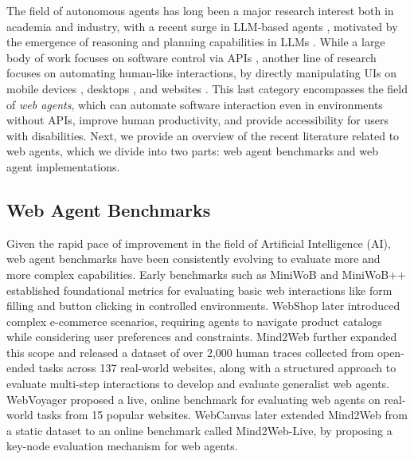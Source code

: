 \documentclass[10pt]{article} %
\begin{document}
The field of autonomous agents has long been a major research interest both in academia and industry, with a recent surge in LLM-based agents \citep{wang2024survey}, motivated by the emergence of reasoning and planning capabilities in LLMs
\citep{Huang2024UnderstandingTP,Wang2024ExploringTR}.
While a large body of work focuses on software control via APIs \citep{autogpt,hao2024toolkengpt,du2024anytool}, another line of research focuses on automating human-like interactions, by directly manipulating UIs on mobile devices \citep{seq2act,aitw23,androidworld}, desktops \citep{osworld,windows-agent-arena}, and websites \citep{furuta2023multimodal,gur2023webagent,rci-agent,workarena,weblinx}. This last category encompasses the field of \emph{web agents}, which can automate software interaction even in environments without APIs, improve human productivity, and provide accessibility for users with disabilities. Next, we provide an overview of the recent literature related to web agents, which we divide into two parts: web agent benchmarks and web agent implementations.

\subsection{Web Agent Benchmarks}

Given the rapid pace of improvement in the field of Artificial Intelligence (AI), web agent benchmarks have been consistently evolving to evaluate more and more complex capabilities.
Early benchmarks such as MiniWoB and MiniWoB++ \citep{world-of-bits,Miniwob_plusplus} established foundational metrics for evaluating basic web interactions like form filling and button clicking in controlled environments.
WebShop \citep{webshop} later introduced complex e-commerce scenarios, requiring agents to navigate product catalogs while considering user preferences and constraints. Mind2Web \citep{mind2web} further expanded this scope and released a dataset of over 2,000 human traces collected from open-ended tasks across 137 real-world websites, along with a structured approach to evaluate multi-step interactions to develop and evaluate generalist web agents. WebVoyager \citep{web-voyager} proposed a live, online benchmark for evaluating web agents on real-world tasks from 15 popular websites. WebCanvas \citep{webcanvas} later extended Mind2Web from a static dataset to an online benchmark called Mind2Web-Live, by proposing a key-node evaluation mechanism for web agents.
\end{document}
